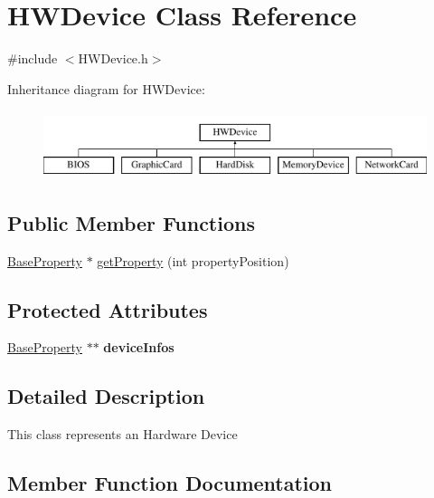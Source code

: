 \hypertarget{classHWDevice}{}\section{H\+W\+Device Class Reference}
\label{classHWDevice}


{\ttfamily \#include $<$H\+W\+Device.\+h$>$}

Inheritance diagram for H\+W\+Device\+:\begin{figure}[H]
\begin{center}
\leavevmode
\includegraphics[height=2.000000cm]{classHWDevice}
\end{center}
\end{figure}
\subsection*{Public Member Functions}
\begin{DoxyCompactItemize}
\item 
\hyperlink{classBaseProperty}{Base\+Property} $\ast$ \hyperlink{classHWDevice_a657e562484d584cd3c1d2c9938b4865c}{get\+Property} (int property\+Position)
\end{DoxyCompactItemize}
\subsection*{Protected Attributes}
\begin{DoxyCompactItemize}
\item 
\hyperlink{classBaseProperty}{Base\+Property} $\ast$$\ast$ {\bfseries device\+Infos}\hypertarget{classHWDevice_a6987786c30ac6a7c026e2dc099a7a124}{}\label{classHWDevice_a6987786c30ac6a7c026e2dc099a7a124}

\end{DoxyCompactItemize}


\subsection{Detailed Description}
This class represents an Hardware Device 

\subsection{Member Function Documentation}

